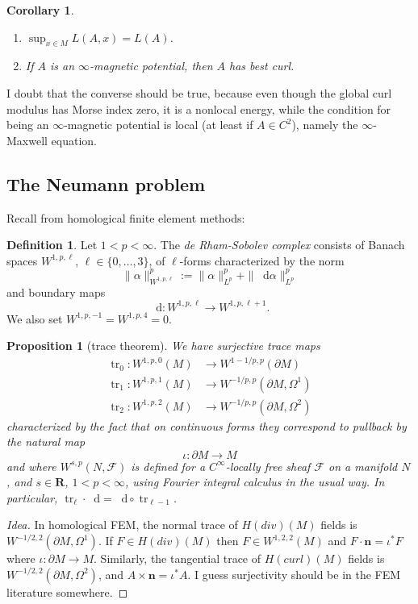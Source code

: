 \documentclass[reqno,11pt]{amsart}
\newcommand{\RR}{\mathbf{R}}
\newcommand*\dif{\mathop{}\!\mathrm{d}}
\DeclareMathOperator{\tr}{tr}
\newcommand{\normal}{\mathbf n}
\newcommand{\dfn}[1]{\emph{#1}\index{#1}}
\newtheorem{proposition}[theorem]{Proposition}
\newtheorem{corollary}[theorem]{Corollary}
\theoremstyle{definition}
\newtheorem{definition}[theorem]{Definition}
\numberwithin{equation}{section}
\begin{document}
\begin{corollary}
\begin{enumerate}
\item $\sup_{x \in M} L(A, x) = L(A)$.
\item If $A$ is an $\infty$-magnetic potential, then $A$ has best curl.
\end{enumerate}
\end{corollary}

I doubt that the converse should be true, because even though the global curl modulus has Morse index zero, it is a nonlocal energy, while the condition for being an $\infty$-magnetic potential is local (at least if $A \in C^2$), namely the $\infty$-Maxwell equation.

\subsection{The Neumann problem}
Recall from homological finite element methods:

\begin{definition}
Let $1 < p < \infty$.
The \dfn{de Rham-Sobolev complex} consists of Banach spaces $W^{1, p, \ell}$, $\ell \in \{0, \dots, 3\}$, of $\ell$-forms characterized by the norm 
$$\|\alpha\|_{W^{1, p, \ell}}^p := \|\alpha\|_{L^p}^p + \|\dif \alpha\|_{L^p}^p$$
and boundary maps 
$$\dif: W^{1, p, \ell} \to W^{1, p, \ell + 1}.$$
We also set $W^{1, p, -1} = W^{1, p, 4} = 0$.
\end{definition}

\begin{proposition}[trace theorem]
We have surjective trace maps
\begin{align*}
\tr_0: W^{1, p, 0}(M) &\to W^{1 - 1/p, p}(\partial M) \\
\tr_1: W^{1, p, 1}(M) &\to W^{-1/p, p}(\partial M, \Omega^1) \\
\tr_2: W^{1, p, 2}(M) &\to W^{-1/p, p}(\partial M, \Omega^2)
\end{align*}
characterized by the fact that on continuous forms they correspond to pullback by the natural map 
$$\iota: \partial M \to M$$
and where $W^{s, p}(N, \mathcal F)$ is defined for a $C^\infty$-locally free sheaf $\mathcal F$ on a manifold $N$, and $s \in \RR$, $1 < p < \infty$, using Fourier integral calculus in the usual way.
In particular, $\tr_\ell \cdot \dif = \dif \circ \tr_{\ell - 1}$.
\end{proposition}
\begin{proof}[Idea]
In homological FEM, the normal trace of $H(div)(M)$ fields is $W^{-1/2, 2}(\partial M, \Omega^1)$.
If $F \in H(div)(M)$ then $F \in W^{1, 2, 2}(M)$ and $F \cdot \normal = \iota^* F$ where $\iota: \partial M \to M$.
Similarly, the tangential trace of $H(curl)(M)$ fields is $W^{-1/2, 2}(\partial M, \Omega^2)$, and $A \times \normal = \iota^* A$.
I guess surjectivity should be in the FEM literature somewhere.
\end{proof}
\end{document}
